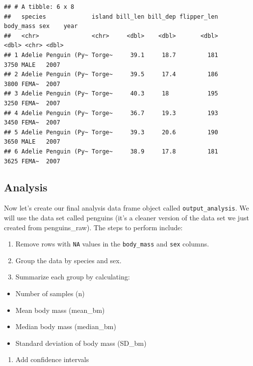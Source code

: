 \documentclass[
]{book}
\providecommand{\tightlist}{%
  \setlength{\itemsep}{0pt}\setlength{\parskip}{0pt}}
\begin{document}
\begin{verbatim}
## # A tibble: 6 x 8
##   species             island bill_len bill_dep flipper_len body_mass sex    year
##   <chr>               <chr>     <dbl>    <dbl>       <dbl>     <dbl> <chr> <dbl>
## 1 Adelie Penguin (Py~ Torge~     39.1     18.7         181      3750 MALE   2007
## 2 Adelie Penguin (Py~ Torge~     39.5     17.4         186      3800 FEMA~  2007
## 3 Adelie Penguin (Py~ Torge~     40.3     18           195      3250 FEMA~  2007
## 4 Adelie Penguin (Py~ Torge~     36.7     19.3         193      3450 FEMA~  2007
## 5 Adelie Penguin (Py~ Torge~     39.3     20.6         190      3650 MALE   2007
## 6 Adelie Penguin (Py~ Torge~     38.9     17.8         181      3625 FEMA~  2007
\end{verbatim}

\subsection{Analysis}\label{analysis}

Now let's create our final analysis data frame object called \texttt{output\_analysis}. We will use the data set called penguins (it's a cleaner version of the data set we just created from penguins\_raw). The steps to perform include:

\begin{enumerate}
\def\labelenumi{\arabic{enumi}.}
\tightlist
\item
  Remove rows with \texttt{NA} values in the \texttt{body\_mass} and \texttt{sex} columns.
\item
  Group the data by species and sex.
\item
  Summarize each group by calculating:
\end{enumerate}

\begin{itemize}
\tightlist
\item
  Number of samples (n)
\item
  Mean body mass (mean\_bm)
\item
  Median body mass (median\_bm)
\item
  Standard deviation of body mass (SD\_bm)
\end{itemize}

\begin{enumerate}
\def\labelenumi{\arabic{enumi}.}
\setcounter{enumi}{3}
\tightlist
\item
  Add confidence intervals
\end{enumerate}
\end{document}
